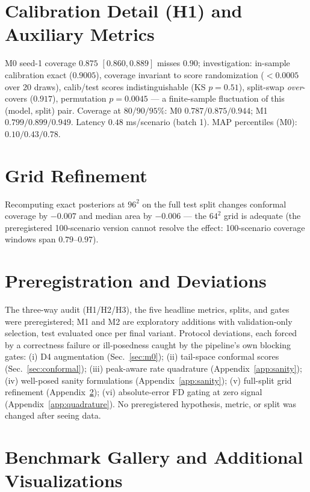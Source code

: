 \documentclass{article}
\begin{document}
\section{Calibration Detail (H1) and Auxiliary Metrics}
\label{app:h1}

M0 seed-1 coverage $0.875$ $[0.860, 0.889]$ misses $0.90$; investigation: in-sample
calibration exact ($0.9005$), coverage invariant to score randomization ($<0.0005$ over
20 draws), calib/test scores indistinguishable (KS $p = 0.51$), split-swap
\emph{over}-covers ($0.917$), permutation $p = 0.0045$ --- a finite-sample fluctuation of
this (model, split) pair. Coverage at $80/90/95\%$: M0 $0.787/0.875/0.944$; M1
$0.799/0.899/0.949$. Latency $0.48$ ms/scenario (batch 1). MAP percentiles (M0):
$0.10/0.43/0.78$.

\section{Grid Refinement}
\label{app:refine}

Recomputing exact posteriors at $96^2$ on the full test split changes conformal coverage
by $-0.007$ and median area by $-0.006$ --- the $64^2$ grid is adequate (the
preregistered 100-scenario version cannot resolve the effect: 100-scenario coverage
windows span $0.79$--$0.97$).

\section{Preregistration and Deviations}
\label{app:devs}

The three-way audit (H1/H2/H3), the five headline metrics, splits, and gates were
preregistered; M1 and M2 are exploratory additions with validation-only selection, test
evaluated once per final variant. Protocol deviations, each forced by a correctness
failure or ill-posedness caught by the pipeline's own blocking gates: (i) D4 augmentation
(Sec.~\ref{sec:m0}); (ii) tail-space conformal scores (Sec.~\ref{sec:conformal});
(iii) peak-aware rate quadrature (Appendix~\ref{app:sanity}); (iv) well-posed sanity
formulations (Appendix~\ref{app:sanity}); (v) full-split grid refinement
(Appendix~\ref{app:refine}); (vi) absolute-error FD gating at zero signal
(Appendix~\ref{app:quadrature}). No preregistered hypothesis, metric, or split was
changed after seeing data.

\section{Benchmark Gallery and Additional Visualizations}
\label{app:gallery}
\end{document}
